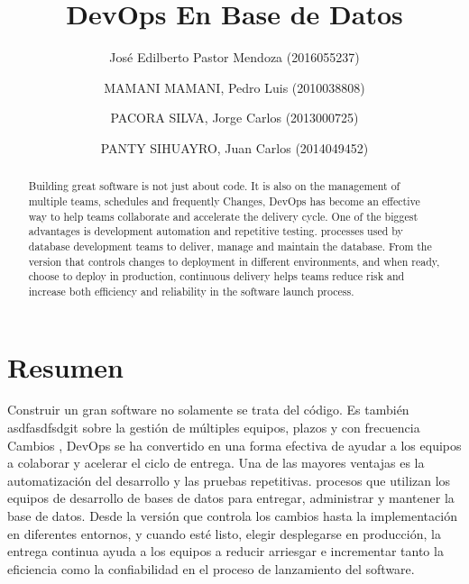 \documentclass[preprint,12pt]{elsarticle}
\begin{document}
	


	\begin{frontmatter}

		\title{\huge  DevOps En Base de Datos}
		
		\author{José Edilberto Pastor Mendoza              (2016055237)}
		\author{MAMANI MAMANI, Pedro Luis              (2010038808)}
		\author{PACORA SILVA, Jorge Carlos                   (2013000725)}
		\author{PANTY SIHUAYRO, Juan Carlos               (2014049452)}
		
		\address{Tacna, Perú}
		
		\begin{abstract}
			
Building great software is not just about code. It is also on the management of multiple teams, schedules and frequently Changes, DevOps has become an effective way to help teams collaborate and accelerate the delivery cycle. One of the biggest advantages is development automation and repetitive testing. processes used by database development teams to deliver, manage and maintain the database. From the version that controls changes to deployment in different environments, and when ready, choose to deploy in production, continuous delivery helps teams reduce risk and increase both efficiency and reliability in the software launch process.


		\end{abstract}
\end{frontmatter}

	\section{Resumen}

Construir un gran software no solamente se trata del código. Es también asdfasdfsdgit
sobre la gestión de múltiples equipos, plazos y con frecuencia
Cambios , DevOps se ha convertido en una forma efectiva de ayudar a los equipos a colaborar y acelerar el ciclo de entrega.
Una de las mayores ventajas es la automatización del desarrollo y las pruebas repetitivas.
procesos que utilizan los equipos de desarrollo de bases de datos para entregar, administrar y mantener la base de datos. Desde la versión que controla los cambios hasta la implementación en diferentes entornos, y cuando esté listo, elegir desplegarse en producción, la entrega continua ayuda a los equipos a reducir
arriesgar e incrementar tanto la eficiencia como la confiabilidad en el proceso de lanzamiento del software.
\end{document}
